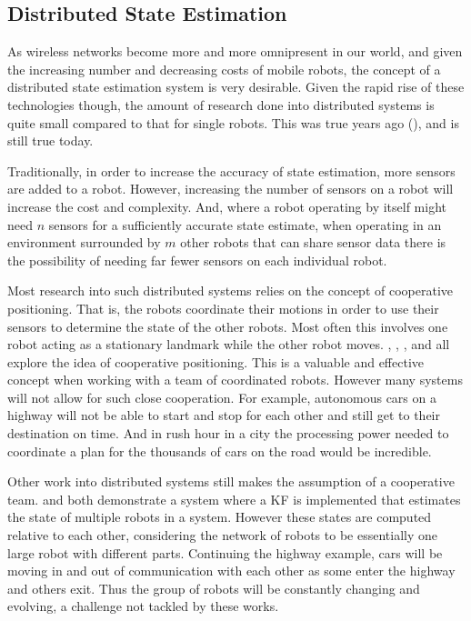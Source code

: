 \documentclass[conference]{IEEEtran}
\begin{document}
\subsection{Distributed State Estimation}
As wireless networks become more and more omnipresent in our world, and given the increasing number and decreasing costs of mobile robots, the concept of a distributed state estimation system is very desirable. Given the rapid rise of these technologies though, the amount of research done into distributed systems is quite small compared to that for single robots. This was true years ago (\cite{Parker2000}), and is still true today.

Traditionally, in order to increase the accuracy of state estimation, more sensors are added to a robot. However, increasing the number of sensors on a robot will increase the cost and complexity. And, where a robot operating by itself might need $n$ sensors for a sufficiently accurate state estimate, when operating in an environment surrounded by $m$ other robots that can share sensor data there is the possibility of needing far fewer sensors on each individual robot.

Most research into such distributed systems relies on the concept of cooperative positioning. That is, the robots coordinate their motions in order to use their sensors to determine the state of the other robots. Most often this involves one robot acting as a stationary landmark while the other robot moves. \cite{Kurazume1994}, \cite{Kurazume1996}, \cite{Kurazume1998}, and \cite{Kurazume2000} all explore the idea of cooperative positioning. This is a valuable and effective concept when working with a team of coordinated robots. However many systems will not allow for such close cooperation. For example, autonomous cars on a highway will not be able to start and stop for each other and still get to their destination on time. And in rush hour in a city the processing power needed to coordinate a plan for the thousands of cars on the road would be incredible.

Other work into distributed systems still makes the assumption of a cooperative team. \cite{Sanderson1997} and \cite{Roumeliotis2002} both demonstrate a system where a KF is implemented that estimates the state of multiple robots in a system. However these states are computed relative to each other, considering the network of robots to be essentially one large robot with different parts. Continuing the highway example, cars will be moving in and out of communication with each other as some enter the highway and others exit. Thus the group of robots will be constantly changing and evolving, a challenge not tackled by these works.
\end{document}
